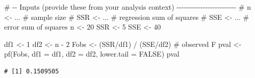\documentclass[
  letterpaper,
  DIV=11,
  numbers=noendperiod]{scrreprt}
\newenvironment{Shaded}{\begin{snugshade}}{\end{snugshade}}
\newcommand{\AttributeTok}[1]{\textcolor[rgb]{0.40,0.45,0.13}{#1}}
\newcommand{\CommentTok}[1]{\textcolor[rgb]{0.37,0.37,0.37}{#1}}
\newcommand{\ConstantTok}[1]{\textcolor[rgb]{0.56,0.35,0.01}{#1}}
\newcommand{\DecValTok}[1]{\textcolor[rgb]{0.68,0.00,0.00}{#1}}
\newcommand{\FunctionTok}[1]{\textcolor[rgb]{0.28,0.35,0.67}{#1}}
\newcommand{\NormalTok}[1]{\textcolor[rgb]{0.00,0.23,0.31}{#1}}
\newcommand{\OtherTok}[1]{\textcolor[rgb]{0.00,0.23,0.31}{#1}}
\newcommand{\SpecialCharTok}[1]{\textcolor[rgb]{0.37,0.37,0.37}{#1}}
\begin{document}
\begin{Shaded}
\begin{Highlighting}[]
\CommentTok{\# {-}{-} Inputs (provide these from your analysis context) {-}{-}{-}{-}{-}{-}{-}{-}{-}{-}{-}{-}{-}{-}{-}{-}{-}{-}{-}{-}{-}{-}{-}{-}{-}}
\CommentTok{\# n   \textless{}{-} ...   \# sample size}
\CommentTok{\# SSR \textless{}{-} ...   \# regression sum of squares}
\CommentTok{\# SSE \textless{}{-} ...   \# error sum of squares}
\NormalTok{n   }\OtherTok{\textless{}{-}} \DecValTok{20}
\NormalTok{SSR }\OtherTok{\textless{}{-}} \DecValTok{5}
\NormalTok{SSE }\OtherTok{\textless{}{-}} \DecValTok{40}




\NormalTok{df1  }\OtherTok{\textless{}{-}} \DecValTok{1}
\NormalTok{df2  }\OtherTok{\textless{}{-}}\NormalTok{ n }\SpecialCharTok{{-}} \DecValTok{2}
\NormalTok{Fobs }\OtherTok{\textless{}{-}}\NormalTok{ (SSR}\SpecialCharTok{/}\NormalTok{df1) }\SpecialCharTok{/}\NormalTok{ (SSE}\SpecialCharTok{/}\NormalTok{df2)         }\CommentTok{\# observed F}
\NormalTok{pval }\OtherTok{\textless{}{-}} \FunctionTok{pf}\NormalTok{(Fobs, }\AttributeTok{df1 =}\NormalTok{ df1, }\AttributeTok{df2 =}\NormalTok{ df2, }\AttributeTok{lower.tail =} \ConstantTok{FALSE}\NormalTok{)}
\NormalTok{pval}
\end{Highlighting}
\end{Shaded}

\begin{verbatim}
# [1] 0.1509505
\end{verbatim}
\end{document}
